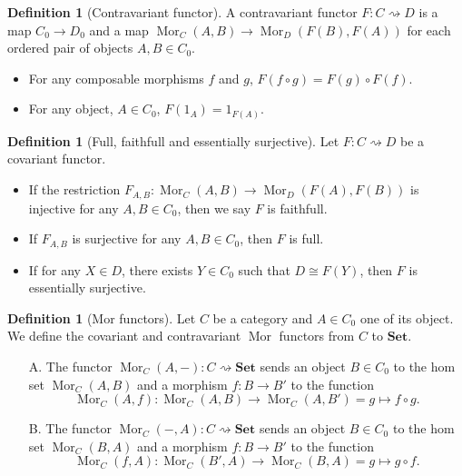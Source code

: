 \documentclass[paper=a4, fontsize=12pt]{scrartcl} %
\theoremstyle{definition}
\newtheorem{defn}[thm]{Definition}
\theoremstyle{remark}
\DeclareMathOperator{\Mor}{Mor}
\begin{document}
\begin{defn}[Contravariant functor]
	A contravariant functor $F: C\rightsquigarrow D$ is a map $C_0 \rightarrow D_0$ and a map $\Mor_C(A,B) \rightarrow \Mor_D(F(B),F(A))$ for each ordered pair of objects $A, B\in C_0$.
	\begin{itemize}
		\item For any composable morphisms $f$ and $g$, $F(f\circ g) = F(g) \circ F(f)$.
		\item For any object, $A \in C_0$, $F(1_A) = 1_{F(A)}$.
	\end{itemize}
\end{defn}
\begin{defn}[Full, faithfull and essentially surjective]
	Let $F:C \rightsquigarrow D$ be a covariant functor.
	\begin{itemize}
		\item If the restriction $F_{A,B}:\Mor_C(A,B) \rightarrow \Mor_D(F(A), F(B))$ is injective for any $A,B \in C_0$, then we say $F$ is faithfull.
		\item If $F_{A,B}$ is surjective for any $A,B \in C_0$, then $F$ is full.
		\item If for any $X \in D$, there exists $Y \in C_0$ such that $D \cong F(Y)$, then $F$ is essentially surjective.
	\end{itemize}
\end{defn}
\begin{defn}[Mor functors]\label{homfunc}
	Let $C$ be a category and $A \in C_0$ one of its object. We define the covariant and contravariant $\Mor$ functors from $C$ to $\textbf{Set}$.
	\begin{enumerate}
		\item[A.] The functor $\Mor_C(A,-): C \rightsquigarrow \textbf{Set}$ sends an object $B\in C_0$ to the hom set $\Mor_C(A,B)$ and a morphism $f:B\rightarrow B'$ to the function $$\Mor_C(A,f): \Mor_C(A,B) \rightarrow \Mor_C(A,B') = g \mapsto f\circ g.$$
		
		\item[B.] The functor $\Mor_C(-,A): C \rightsquigarrow \textbf{Set}$ sends an object $B\in C_0$ to the hom set $\Mor_C(B,A)$ and a morphism $f:B\rightarrow B'$ to the function $$\Mor_C(f,A): \Mor_C(B',A) \rightarrow \Mor_C(B,A) = g \mapsto g\circ f.$$
	\end{enumerate}
\end{defn}
\end{document}
